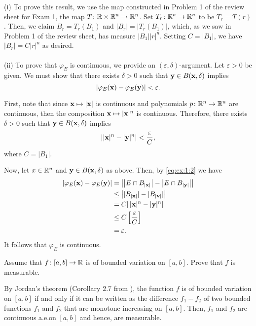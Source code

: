 \begin{solution}
(i) To prove this result, we use the map constructed in Problem 1 of the
review sheet for Exam 1, the map $T\colon\mathbb{R}\times\mathbb{R}^n\to\mathbb{R}^n$. Set
$T_r\colon\mathbb{R}^n\to\mathbb{R}^n$ to be $T_r= T(r)$. Then, we claim
$B_r=T_r(B_1)$ and $|B_r|=|T_r(B_1)|$, which, as we saw in Problem 1 of the
review sheet, has measure $|B_1||r|^n$. Setting $C= |B_1|$, we have
$|B_r|=C|r|^n$ as desired.
\\\\
(ii) To prove that $\varphi_E$ is continuous, we provide an
$(\varepsilon,\delta)$-argument. Let $\varepsilon>0$ be given. We must show
that there exists $\delta>0$ such that $\mathbf{y}\in B(\mathbf{x},\delta)$ implies
\begin{equation}
\label{eq:ex:1:1}
\left|\varphi_E(\mathbf{x})-\varphi_E(\mathbf{y})\right|<\varepsilon.
\end{equation}

First, note that since $\mathbf{x}\mapsto |\mathbf{x}|$ is continuous and polynomials
$p\colon\mathbb{R}^n\to\mathbb{R}^n$ are continuous, then the composition
$\mathbf{x}\mapsto|\mathbf{x}|^n$ is continuous. Therefore, there exists $\delta>0$
such that $\mathbf{y}\in B(\mathbf{x},\delta)$ implies
\begin{equation}
\label{eq:ex:1:2}
\left||\mathbf{x}|^n-|\mathbf{y}|^n\right|<\frac{\varepsilon}{C},
\end{equation}
where $C= |B_1|$.

Now, let $x\in\mathbb{R}^n$ and $\mathbf{y}\in B(\mathbf{x},\delta)$ as above. Then, by
\eqref{eq:ex:1:2} we have
\begin{equation}
\label{eq:ex:1:3}
\begin{aligned}
\left|\varphi_E(\mathbf{x})-\varphi_E(\mathbf{y})\right|
&=\left|
\left|E\cap B_{|\mathbf{x}|}\right|
-
\left|E\cap B_{|\mathbf{y}|}\right|
\right|\\
&\leq\left| |B_{|\mathbf{x}|}|-|B_{|\mathbf{y}|}|\right|\\
&=C|\left|\mathbf{x}|^n-|\mathbf{y}|^n\right|\\
&\leq C\left[\frac{\varepsilon}{C}\right]\\
&=\varepsilon.
\end{aligned}
\end{equation}
It follows that $\varphi_E$ is continuous.
\end{solution}

\begin{problem}
Assume that $f\colon[a,b]\to\mathbb{R}$ is of bounded variation on $[a,b]$. Prove
that $f$ is measurable.
\end{problem}
\begin{solution}
By Jordan's theorem (Corollary 2.7 from \cite[Ch.\@ 2, p.\@
21]{wheeden-zygmund}), the function $f$ is of bounded variation on $[a,b]$
if and only if it can be written as the difference $f_1-f_2$ of two bounded
functions $f_1$ and $f_2$ that are monotone increasing on $[a,b]$. Then,
$f_1$ and $f_2$ are continuous a.e.\@ on $[a,b]$ and hence, are
measurable.
\end{solution}

